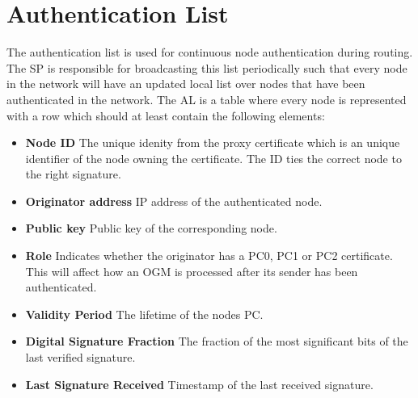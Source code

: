 \section{Authentication List} \label{al}
The authentication list is used for continuous node authentication during routing. The SP is responsible for broadcasting this list periodically such that every node in the network will have an updated local list over nodes that have been authenticated in the network. The AL is a table where every node is represented with a row which should at least contain the following elements:

\begin{itemize}
\item \textbf{Node ID} The unique idenity from the proxy certificate which is an unique identifier of the node owning the certificate. The ID ties the correct node to the right signature.
\item \textbf{Originator address} IP address of the authenticated node.
\item \textbf{Public key} Public key of the corresponding node.
\item \textbf{Role} Indicates whether the originator has a PC0, PC1 or PC2 certificate. This will affect how an OGM is processed after its sender has been authenticated.
\item \textbf{Validity Period} The lifetime of the nodes PC. 
\item \textbf{Digital Signature Fraction} The fraction of the most significant bits of the last verified signature.
\item \textbf{Last Signature Received} Timestamp of the last received signature.
\end{itemize}

